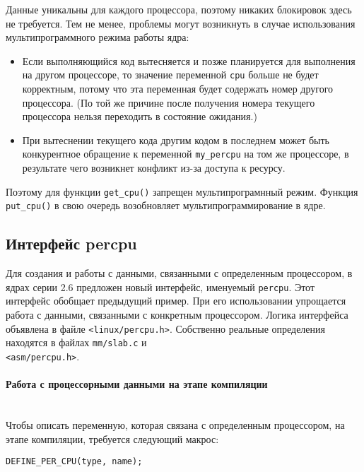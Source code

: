\documentclass[12pt]{article}
\begin{document}
Данные уникальны для каждого процессора, поэтому никаких блокировок здесь не требуется.
Тем не менее, проблемы могут возникнуть в случае использования мультипрограммного режима работы ядра:

\begin{itemize}
    \item Если выполняющийся код вытесняется и позже планируется для выполнения
    на другом процессоре, то значение переменной \verb!cpu! больше не будет корректным, потому что эта переменная будет содержать номер другого процессора.
    (По той же причине после получения номера текущего процессора нельзя переходить в состояние ожидания.)
    \item При вытеснении текущего кода другим кодом в последнем может быть конкурентное обращение к переменной \verb!my_percpu! на том же процессоре, в результате чего возникнет конфликт из-за доступа к ресурсу.
\end{itemize}

Поэтому для функции \verb!get_cpu()! запрещен мультипрограмнный режим. Функция \verb!put_cpu()! в свою очередь возобновляет
мультипрограммирование в ядре.

\pagebreak
\subsection*{Интерфейс percpu}

Для создания и работы с данными, связанными с определенным процессором, в ядрах
серии 2.6 предложен новый интерфейс, именуемый \verb!percpu!. Этот интерфейс обобщает
предыдущий пример. При его использовании упрощается работа с данными, связанными
с конкретным процессором. Логика интерфейса объявлена в файле \verb!<linux/percpu.h>!.
Собственно реальные определения находятся в файлах \verb!mm/slab.c! и \\ \verb!<asm/percpu.h>!. 

\paragraph*{Работа с процессорными данными на этапе компиляции}
~\\

Чтобы описать переменную, которая связана с определенным процессором, на этапе компиляции, требуется 
следующий макрос:

\begin{lstlisting}
DEFINE_PER_CPU(type, name);
\end{lstlisting}
\end{document}
